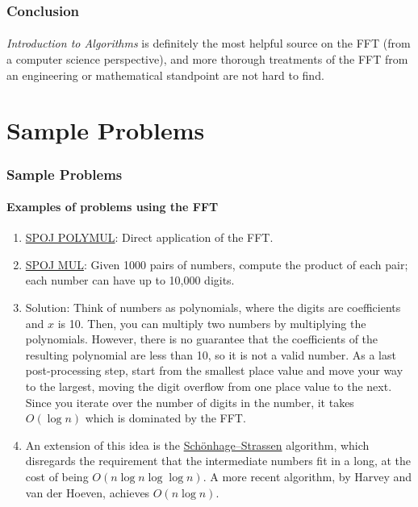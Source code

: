 \documentclass[11pt,handout]{beamer}             %
\begin{document}
\begin{frame}
\frametitle{Conclusion}
\framesubtitle{}
\textit{Introduction to Algorithms} is definitely the most helpful source on
the FFT (from a computer science perspective), and more thorough treatments of
the FFT from an engineering or mathematical standpoint are not hard to find.
\end{frame}

\section{Sample Problems}
\begin{frame}
\frametitle{Sample Problems}
\framesubtitle{Examples of problems using the FFT}
\begin{enumerate}
  \item \href{https://www.spoj.com/problems/POLYMUL/}{SPOJ POLYMUL}:
    Direct application of the FFT.

  \item \href{https://www.spoj.com/problems/MUL/}{SPOJ MUL}:
    Given 1000 pairs of numbers, compute the product of each pair;
    each number can have up to 10,000 digits.
    \addtocounter{enumi}{-1}
  \item Solution: Think of numbers as polynomials,
    where the digits are coefficients and \( x \) is 10.
    Then, you can multiply two numbers by multiplying the polynomials.
    However, there is no guarantee that the coefficients
    of the resulting polynomial are less than 10, so it is not a valid number.
    As a last post-processing step, start from the smallest place value
    and move your way to the largest, moving the digit overflow from one place
    value to the next. Since you iterate over the number of digits in the
    number, it takes \( O(\log n) \) which is dominated by the FFT.  
    \addtocounter{enumi}{-1}
  \item An extension of this idea is the 
    \href{https://en.wikipedia.org/wiki/Sch\%C3\%B6nhage\%E2\%80\%93Strassen_algorithm}
    {Schönhage–Strassen} algorithm, which disregards the requirement
    that the intermediate numbers fit in a long, at the cost of being
    \( O(n \log n \log \log n) \). A more recent algorithm,
    by Harvey and van der Hoeven, achieves 
    \href{https://hal.archives-ouvertes.fr/hal-02070778/document}{\( O(n \log n) \)}.


\end{enumerate}
\end{frame}
\end{document}
